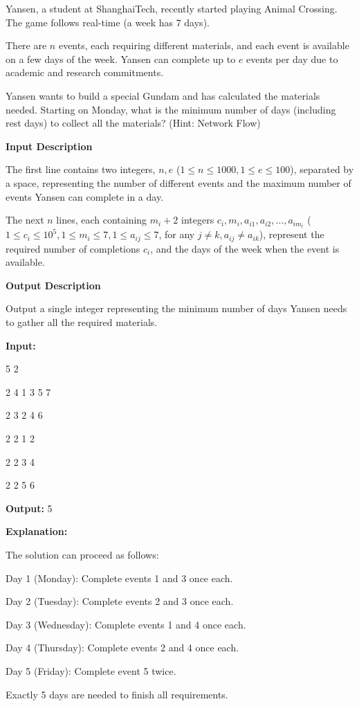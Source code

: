 \problem{}
Yansen, a student at ShanghaiTech, recently started playing Animal Crossing. The game follows real-time (a week has 7 days).

There are $n$ events, each requiring different materials, and each event is available on a few days of the week. Yansen can complete up to $e$ events per day due to academic and research commitments.

Yansen wants to build a special Gundam and has calculated the materials needed. Starting on Monday, what is the minimum number of days (including rest days) to collect all the materials? (Hint: Network Flow)

\textbf{Input Description}

The first line contains two integers, $n, e$ ($1 \le n \le 1000, 1 \le e \le 100$), separated by a space, representing the number of different events and the maximum number of events Yansen can complete in a day.

The next $n$ lines, each containing $m_i + 2$ integers $c_i, m_i, a_{i1}, a_{i2}, \dots, a_{im_i}$ ($1 \le c_i \le 10^5, 1 \le m_i \le 7, 1 \le a_{ij} \le 7$, for any $j \neq k, a_{ij} \neq a_{ik}$), represent the required number of completions $c_i$, and the days of the week when the event is available.

\textbf{Output Description}

Output a single integer representing the minimum number of days Yansen needs to gather all the required materials.

\textbf{Input:}

5 2

2 4 1 3 5 7

2 3 2 4 6

2 2 1 2

2 2 3 4

2 2 5 6


\textbf{Output:}
5


\textbf{Explanation:}

The solution can proceed as follows:

Day 1 (Monday): Complete events 1 and 3 once each.

Day 2 (Tuesday): Complete events 2 and 3 once each.

Day 3 (Wednesday): Complete events 1 and 4 once each.

Day 4 (Thursday): Complete events 2 and 4 once each.

Day 5 (Friday): Complete event 5 twice.

Exactly 5 days are needed to finish all requirements.

\solution{
}
\newpage